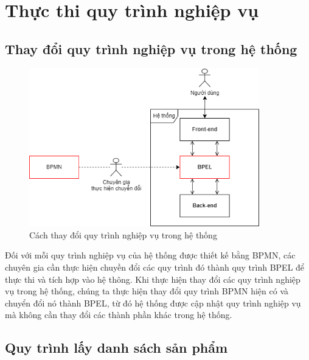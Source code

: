 \section{Thực thi quy trình nghiệp vụ}

\subsection{Thay đổi quy trình nghiệp vụ trong hệ thống}
\begin{figure}[!htp]
    \centering
    \includegraphics[width=10cm]{img/bpel/tranfer.png}
    \newline
    \caption{Cách thay đổi quy trình nghiệp vụ trong hệ thống}
\end{figure}

Đối với mỗi quy trình nghiệp vụ của hệ thống được thiết kế bằng BPMN, các chuyên gia cần thực hiện chuyền đổi các quy trình đó thành quy trình BPEL để thực thi và tích hợp vào hệ thông. Khi thực hiện thay đổi các quy trình nghiệp vụ trong hệ thống, chúng ta thực hiện thay đổi quy trình BPMN hiện có và chuyển đổi nó thành BPEL, từ đó hệ thống được cập nhật quy trình nghiệp vụ mà không cần thay đổi các thành phần khác trong hệ thống.


\subsection{Quy trình lấy danh sách sản phẩm}

